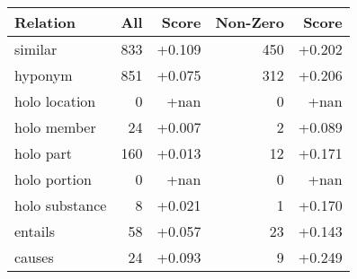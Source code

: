 \begin{tabular}{lrrrr}
Relation  & All & Score & Non-Zero & Score \\ \hline
similar & 833 & +0.109 & 450 & +0.202\\
hyponym & 851 & +0.075 & 312 & +0.206\\
holo location & 0 & +nan & 0 & +nan\\
holo member & 24 & +0.007 & 2 & +0.089\\
holo part & 160 & +0.013 & 12 & +0.171\\
holo portion & 0 & +nan & 0 & +nan\\
holo substance & 8 & +0.021 & 1 & +0.170\\
entails & 58 & +0.057 & 23 & +0.143\\
causes & 24 & +0.093 & 9 & +0.249\\
\end{tabular}
